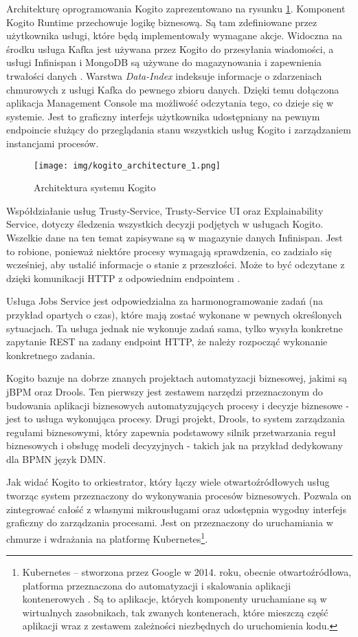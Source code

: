 \documentclass[declaration,shortabstract,mgr]{iithesis}
\newcommand{\bpmn}{BPMN }
\begin{document}
Architekturę oprogramowania Kogito zaprezentowano na rysunku \ref{fig:kogito-architecture}. Komponent Kogito Runtime przechowuje logikę biznesową. Są tam zdefiniowane przez użytkownika usługi, które będą implementowały wymagane akcje. Widoczna na środku usługa Kafka jest używana przez Kogito do przesyłania wiadomości, a usługi Infinispan i MongoDB są używane do magazynowania i zapewnienia trwałości danych \cite{kogito-services}. Warstwa \textit{Data-Index} indeksuje informacje o zdarzeniach chmurowych z usługi Kafka do pewnego zbioru danych. Dzięki temu dołączona aplikacja Management Console ma możliwość odczytania tego, co dzieje się w systemie. Jest to graficzny interfejs użytkownika udostępniany na pewnym endpoincie służący do przeglądania stanu wszystkich usług Kogito i zarządzaniem instancjami procesów.

\begin{figure}[H]
    \texttt{[image: img/kogito\_architecture\_1.png]}
    \caption{Architektura systemu Kogito \cite{kogito-architecture}}
    \label{fig:kogito-architecture}
\end{figure}

Współdziałanie usług Trusty-Service, Trusty-Service UI oraz Explainability Service, dotyczy śledzenia wszystkich decyzji podjętych w usługach Kogito. Wszelkie dane na ten temat zapisywane są w magazynie danych Infinispan. Jest to robione, ponieważ niektóre procesy wymagają sprawdzenia, co zadziało się wcześniej, aby ustalić informacje o stanie z przeszłości. Może to być odczytane z dzięki komunikacji HTTP z odpowiednim endpointem \cite{kogito-trusty-services}.

Usługa Jobs Service jest odpowiedzialna za harmonogramowanie zadań (na przykład opartych o czas), które mają zostać wykonane w pewnych określonych sytuacjach. Ta usługa jednak nie wykonuje zadań sama, tylko wysyła konkretne zapytanie REST na zadany endpoint HTTP, że należy rozpocząć wykonanie konkretnego zadania.

Kogito bazuje na dobrze znanych projektach automatyzacji biznesowej, jakimi są jBPM oraz Drools. Ten pierwszy jest zestawem narzędzi przeznaczonym do budowania aplikacji biznesowych automatyzujących procesy i decyzje biznesowe - jest to usługa wykonująca procesy. Drugi projekt, Drools, to system zarządzania regułami biznesowymi, który zapewnia podstawowy silnik przetwarzania reguł biznesowych i obsługę modeli decyzyjnych - takich jak na przykład dedykowany dla \bpmn język DMN.

\newpage
Jak widać Kogito to orkiestrator, który łączy wiele otwartoźródłowych usług tworząc system przeznaczony do wykonywania procesów biznesowych. Pozwala on zintegrować całość z własnymi mikrousługami oraz udostępnia wygodny interfejs graficzny do zarządzania procesami. Jest on przeznaczony do uruchamiania w chmurze i wdrażania na platformę Kubernetes\footnote{Kubernetes – stworzona przez Google w 2014. roku, obecnie otwartoźródłowa, platforma przeznaczona do automatyzacji i skalowania aplikacji kontenerowych \cite{wiki-k8s}. Są to aplikacje, których komponenty uruchamiane są w wirtualnych zasobnikach, tak zwanych kontenerach, które mieszczą część aplikacji wraz z zestawem zależności niezbędnych do uruchomienia kodu.}.
\end{document}
